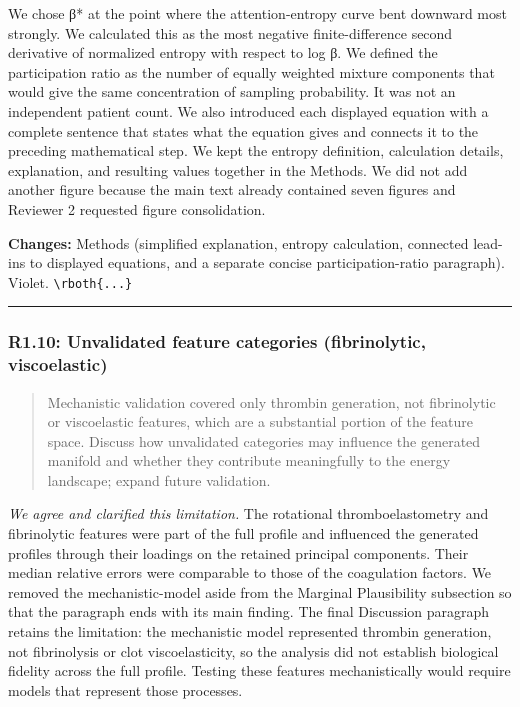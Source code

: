 \documentclass[
  11pt,
  letterpaper,
]{article}
\begin{document}
We chose β* at the point where the attention-entropy curve bent downward most strongly. We calculated this as the most negative finite-difference second derivative of normalized entropy with respect to log β. We defined the participation ratio as the number of equally weighted mixture components that would give the same concentration of sampling probability. It was not an independent patient count. We also introduced each displayed equation with a complete sentence that states what the equation gives and connects it to the preceding mathematical step. We kept the entropy definition, calculation details, explanation, and resulting values together in the Methods. We did not add another figure because the main text already contained seven figures and Reviewer 2 requested figure consolidation.

\textbf{Changes:} Methods (simplified explanation, entropy calculation, connected lead-ins to displayed equations, and a separate concise participation-ratio paragraph). Violet. \texttt{\textbackslash{}rboth\{...\}}

\begin{center}\rule{0.5\linewidth}{0.5pt}\end{center}

\subsubsection{R1.10: Unvalidated feature categories (fibrinolytic, viscoelastic)}\label{r110-unvalidated-feature-categories-fibrinolytic-viscoelastic}

\begin{quote}
Mechanistic validation covered only thrombin generation, not fibrinolytic or viscoelastic features, which are a substantial portion of the feature space. Discuss how unvalidated categories may influence the generated manifold and whether they contribute meaningfully to the energy landscape; expand future validation.
\end{quote}

\emph{We agree and clarified this limitation.} The rotational thromboelastometry and fibrinolytic features were part of the full profile and influenced the generated profiles through their loadings on the retained principal components. Their median relative errors were comparable to those of the coagulation factors. We removed the mechanistic-model aside from the Marginal Plausibility subsection so that the paragraph ends with its main finding. The final Discussion paragraph retains the limitation: the mechanistic model represented thrombin generation, not fibrinolysis or clot viscoelasticity, so the analysis did not establish biological fidelity across the full profile. Testing these features mechanistically would require models that represent those processes.
\end{document}
